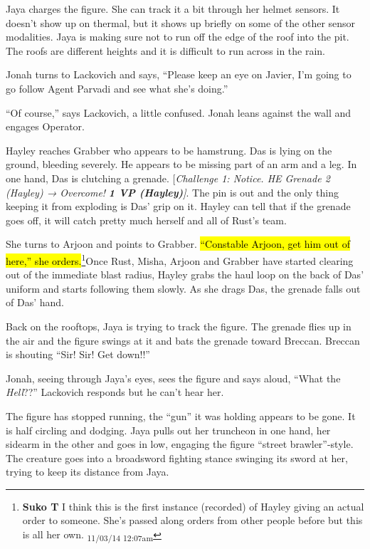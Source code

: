 Jaya charges the figure.  She can track it a bit through her helmet sensors.  It doesn't show up on thermal, but it shows up briefly on some of the other sensor modalities.  Jaya is making sure not to run off the edge of the roof into the pit. The roofs are different heights and it is difficult to run across in the rain.



Jonah turns to Lackovich and says, ``Please keep an eye on Javier, I'm going to go follow Agent Parvadi and see what she's doing.''

``Of course,'' says Lackovich, a little confused.   Jonah leans against the wall and engages Operator.



Hayley reaches Grabber who appears to be hamstrung.  Das is lying on the ground, bleeding severely.  He appears to be missing part of an arm and a leg.  In one hand, Das is clutching a grenade.  {[}\textit{Challenge 1: Notice.  HE Grenade 2 (Hayley) → Overcome! }\textit{\textbf{1 VP (Hayley)}}\textit{{]}}.  The pin is out and the only thing keeping it from exploding is Das' grip on it.  Hayley can tell that if the grenade goes off, it will catch pretty much herself and all of Rust's team.

She turns to Arjoon and points to Grabber.  \hl{``Constable Arjoon, get him out of here,'' she orders.}\footnote{\textbf{Suko T }I think this is the first instance (recorded) of Hayley giving an actual order to someone.  She's passed along orders from other people before but this is all her own. \textsubscript{11/03/14 12:07am}}Once Rust, Misha, Arjoon and Grabber have started clearing out of the immediate blast radius, Hayley grabs the haul loop on the back of Das' uniform and starts following them slowly.  As she drags Das, the grenade falls out of Das' hand. 



Back on the rooftops, Jaya is trying to track the figure.  The grenade flies up in the air and the figure swings at it and bats the grenade toward Breccan.  Breccan is shouting ``Sir!  Sir!  Get down!!''

Jonah, seeing through Jaya's eyes, sees the figure and says aloud, ``What the \textit{Hell}??''  Lackovich responds but he can't hear her.

The figure has stopped running, the ``gun'' it was holding appears to be gone.  It is half circling and dodging.  Jaya pulls out her truncheon in one hand, her sidearm in the other and goes in low, engaging the figure ``street brawler''-style.  The creature goes into a broadsword fighting stance swinging its sword at her, trying to keep its distance from Jaya.

